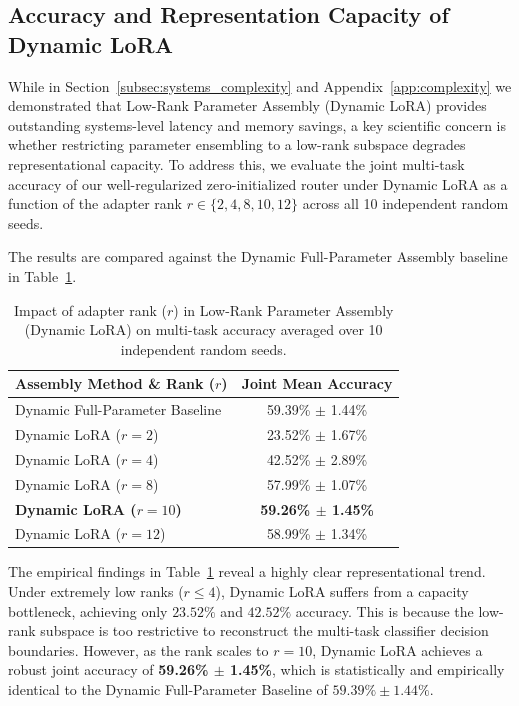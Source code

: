 \subsection{Accuracy and Representation Capacity of Dynamic LoRA}
\label{subsec:lora_capacity_experiments}
While in Section~\ref{subsec:systems_complexity} and Appendix~\ref{app:complexity} we demonstrated that Low-Rank Parameter Assembly (Dynamic LoRA) provides outstanding systems-level latency and memory savings, a key scientific concern is whether restricting parameter ensembling to a low-rank subspace degrades representational capacity. To address this, we evaluate the joint multi-task accuracy of our well-regularized zero-initialized router under Dynamic LoRA as a function of the adapter rank $r \in \{2, 4, 8, 10, 12\}$ across all 10 independent random seeds.

The results are compared against the Dynamic Full-Parameter Assembly baseline in Table~\ref{tab:lora_capacity}.

\begin{table}[h]
\caption{Impact of adapter rank ($r$) in Low-Rank Parameter Assembly (Dynamic LoRA) on multi-task accuracy averaged over 10 independent random seeds.}
\label{tab:lora_capacity}
\vskip 0.15in
\begin{center}
\begin{small}
\begin{sc}
\setlength{\tabcolsep}{8pt}
\begin{tabular}{lc}
\toprule
Assembly Method \& Rank ($r$) & Joint Mean Accuracy \\
\midrule
Dynamic Full-Parameter Baseline & 59.39\% $\pm$ 1.44\% \\
\midrule
Dynamic LoRA ($r=2$)            & 23.52\% $\pm$ 1.67\% \\
Dynamic LoRA ($r=4$)            & 42.52\% $\pm$ 2.89\% \\
Dynamic LoRA ($r=8$)            & 57.99\% $\pm$ 1.07\% \\
\textbf{Dynamic LoRA ($r=10$)}  & \textbf{59.26\% $\pm$ 1.45\%} \\
Dynamic LoRA ($r=12$)            & 58.99\% $\pm$ 1.34\% \\
\bottomrule
\end{tabular}
\end{sc}
\end{small}
\end{center}
\vskip -0.1in
\end{table}

The empirical findings in Table~\ref{tab:lora_capacity} reveal a highly clear representational trend. Under extremely low ranks ($r \le 4$), Dynamic LoRA suffers from a capacity bottleneck, achieving only $23.52\%$ and $42.52\%$ accuracy. This is because the low-rank subspace is too restrictive to reconstruct the multi-task classifier decision boundaries. However, as the rank scales to $r=10$, Dynamic LoRA achieves a robust joint accuracy of \textbf{59.26\% $\pm$ 1.45\%}, which is statistically and empirically identical to the Dynamic Full-Parameter Baseline of $59.39\% \pm 1.44\%$.

